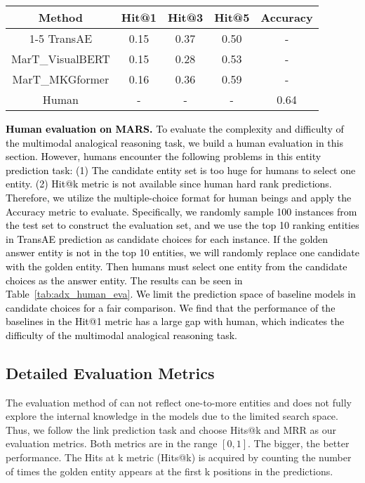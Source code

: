 \documentclass{article} \usepackage{iclr2023_conference,times}
\newcommand{\ours}{MarT}
\newcommand{\data}{MARS}
\begin{document}
\begin{table*}[!htp]\color{black}
\small
\centering
\begin{tabular}{ccccc}
\toprule
  Method & Hit@1 & Hit@3 & Hit@5 & Accuracy \\
\cmidrule{1-5}
    TransAE & 0.15 & 0.37 & 0.50 & - \\
    {\ours}\_VisualBERT & 0.15 & 0.28 & 0.53 & - \\
    {\ours}\_MKGformer & 0.16 & 0.36 & 0.59 & - \\
    Human & - & - & - & 0.64 \\
\bottomrule
\end{tabular}
\caption{\textcolor{black}{Human evaluation on {\data}.}}
\label{tab:adx_human_eva}
\end{table*}
\textcolor{black}{
\textbf{Human evaluation on \data.}
To evaluate the complexity and difficulty of the multimodal analogical reasoning task, we build a human evaluation in this section. However, humans encounter the following problems in this entity prediction task: (1) The candidate entity set is too huge for humans to select one entity. (2) Hit@k metric is not available since human hard rank predictions. Therefore, we utilize the multiple-choice format for human beings and apply the Accuracy metric to evaluate. Specifically, we randomly sample 100 instances from the test set to construct the evaluation set, and we use the top 10 ranking entities in TransAE prediction as candidate choices for each instance. If the golden answer entity is not in the top 10 entities, we will randomly replace one candidate with the golden entity. Then humans must select one entity from the candidate choices as the answer entity. The results can be seen in Table~\ref{tab:adx_human_eva}. We limit the prediction space of baseline models in candidate choices for a fair comparison. We find that the performance of the baselines in the Hit@1 metric  has a large gap with human, which indicates the difficulty of the multimodal analogical reasoning task. 
}


\subsection{Detailed Evaluation Metrics}
\label{adx:metric}

The evaluation method of \citep{E-KAR} can not reflect one-to-more entities and does not fully explore the internal knowledge in the models due to the limited search space. 
Thus, we follow the link prediction task and choose Hits@k and MRR as our evaluation metrics. Both metrics are in the range $\left[ 0,1 \right]$. The bigger, the better performance.
The Hits at k metric (Hits@k) is acquired by counting the number of times the golden entity appears at the first k positions in the predictions. 
\end{document}
